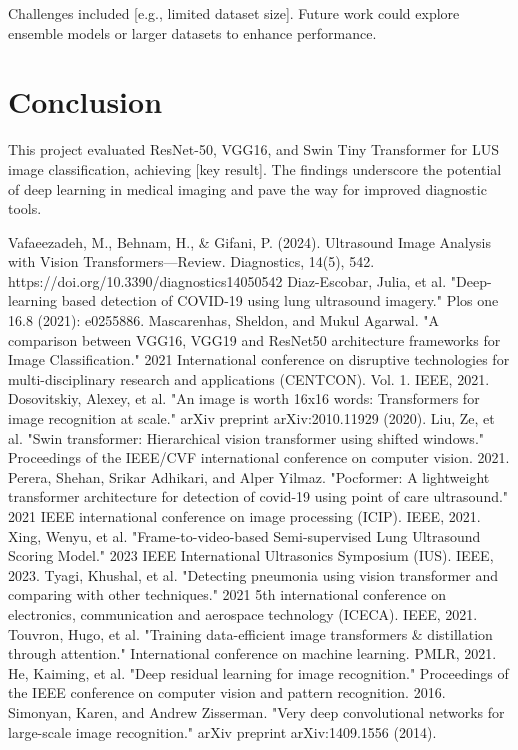 \documentclass[12pt, a4paper]{article}
\begin{document}
Challenges included [e.g., limited dataset size]. Future work could explore ensemble models or larger datasets to enhance performance.

\section{Conclusion}
\label{sec:conclusion}
This project evaluated ResNet-50, VGG16, and Swin Tiny Transformer for LUS image classification, achieving [key result]. The findings underscore the potential of deep learning in medical imaging and pave the way for improved diagnostic tools.

\begin{thebibliography}{9}
	 Vafaeezadeh, M., Behnam, H., \& Gifani, P. (2024). Ultrasound Image Analysis with Vision Transformers—Review. Diagnostics, 14(5), 542. https://doi.org/10.3390/diagnostics14050542
	 Diaz-Escobar, Julia, et al. "Deep-learning based detection of COVID-19 using lung ultrasound imagery." Plos one 16.8 (2021): e0255886.
	 Mascarenhas, Sheldon, and Mukul Agarwal. "A comparison between VGG16, VGG19 and ResNet50 architecture frameworks for Image Classification." 2021 International conference on disruptive technologies for multi-disciplinary research and applications (CENTCON). Vol. 1. IEEE, 2021.
	 Dosovitskiy, Alexey, et al. "An image is worth 16x16 words: Transformers for image recognition at scale." arXiv preprint arXiv:2010.11929 (2020).
	 Liu, Ze, et al. "Swin transformer: Hierarchical vision transformer using shifted windows." Proceedings of the IEEE/CVF international conference on computer vision. 2021.
	 Perera, Shehan, Srikar Adhikari, and Alper Yilmaz. "Pocformer: A lightweight transformer architecture for detection of covid-19 using point of care ultrasound." 2021 IEEE international conference on image processing (ICIP). IEEE, 2021.
	 Xing, Wenyu, et al. "Frame-to-video-based Semi-supervised Lung Ultrasound Scoring Model." 2023 IEEE International Ultrasonics Symposium (IUS). IEEE, 2023.
	 Tyagi, Khushal, et al. "Detecting pneumonia using vision transformer and comparing with other techniques." 2021 5th international conference on electronics, communication and aerospace technology (ICECA). IEEE, 2021.
	 Touvron, Hugo, et al. "Training data-efficient image transformers \& distillation through attention." International conference on machine learning. PMLR, 2021.
	 He, Kaiming, et al. "Deep residual learning for image recognition." Proceedings of the IEEE conference on computer vision and pattern recognition. 2016.
	 Simonyan, Karen, and Andrew Zisserman. "Very deep convolutional networks for large-scale image recognition." arXiv preprint arXiv:1409.1556 (2014).
\end{thebibliography}
\end{document}
